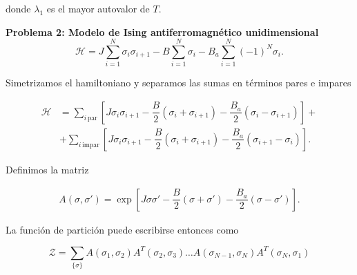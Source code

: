 \documentclass[10pt]{article}
\begin{document}
donde $\lambda_1$ es el mayor autovalor de $T$. 



\textbf{Problema 2: Modelo de Ising antiferromagn\'etico unidimensional}
\\

\begin{equation}
\mathcal{H} = J\sum_{i=1}^N \sigma_i \sigma_{i+1} - B \sum_{i=1}^N \sigma_i- B_a \sum_{i=1}^N (-1)^N \sigma_i.
\end{equation}

Simetrizamos el hamiltoniano y separamos las sumas en t\'erminos pares e impares

\begin{align}
\mathcal{H} &= \sum_{i\,\text{par}} \left[J \sigma_i \sigma_{i+1} - \dfrac{B}{2} \left( \sigma_i + \sigma_{i+1}\right) -\dfrac{B_a}{2} \left( \sigma_i - \sigma_{i+1}\right) \right] + \nonumber \\
&+ \sum_{i\,\text{impar}} \left[J \sigma_i \sigma_{i+1} - \dfrac{B}{2} \left( \sigma_i + \sigma_{i+1}\right) -\dfrac{B_a}{2} \left( \sigma_{i+1} - \sigma_i\right) \right].
\end{align}

Definimos la matriz 

\begin{align*}
A(\sigma,\sigma') = \exp\left[ J \sigma \sigma' - \dfrac{B}{2} \left( \sigma + \sigma'\right) -\dfrac{B_a}{2} \left( \sigma - \sigma'\right) \right].
\end{align*}

La funci\'on de partici\'on puede escribirse entonces como

\begin{equation}
\mathcal{Z} = \sum_{\lbrace\sigma\rbrace} A(\sigma_1,\sigma_2) A^T(\sigma_2,\sigma_3)\dots A(\sigma_{N-1},\sigma_N) A^T(\sigma_N,\sigma_1) 
\end{equation}
\end{document}
